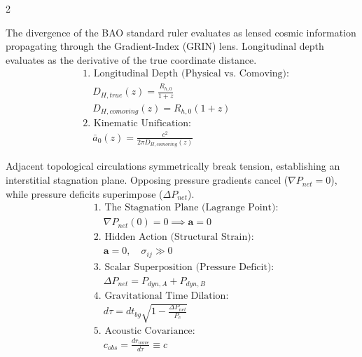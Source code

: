 \begin{multicols}{2}
\begin{tcolorbox}[cheatbox, title={\refstepcounter{cheatnum}\label{box:bao_lensing}\thecheatnum. BAO \& Kinematic Unification \hfill\scriptsize\hyperref[sec:deriv_bao_lensing]{[Proof $\downarrow$]}}]
The divergence of the BAO standard ruler evaluates as lensed cosmic information propagating through the Gradient-Index (GRIN) lens. Longitudinal depth evaluates as the derivative of the true coordinate distance. 
\begin{align}
    &\text{1. Longitudinal Depth (Physical vs. Comoving):} \nonumber \\
    &\quad   D_{H,true}(z) = \frac{R_{h,0}}{1+z} \label{eq:bao_longitudinal} \\
    &\quad   D_{H,comoving}(z) = R_{h,0}(1+z) \label{eq:bao_comoving} \\
    &\text{2. Kinematic Unification:} \nonumber \\
    &\quad \bar{a}_0(z) = \frac{c^2}{2\pi D_{H,comoving}(z)} \label{eq:bao_kinematic_unification_z}
\end{align}
\end{tcolorbox}

\begin{tcolorbox}[cheatbox, title={\refstepcounter{cheatnum}\label{box:auxetic_symmetry_covariance}\thecheatnum. Symmetry Breaking \& Covariance \hfill\makebox[0pt][r]{\scriptsize\hyperref[sec:deriv_auxetic_symmetry_covariance]{[Proof $\downarrow$]}}}]
Adjacent topological circulations symmetrically break tension, establishing an interstitial stagnation plane. Opposing pressure gradients cancel ($\nabla P_{net} = 0$), while pressure deficits superimpose ($\Delta P_{net}$). 
\begin{align}
    &\text{1. The Stagnation Plane (Lagrange Point):} \nonumber \\
    &\quad \nabla P_{net}(0) = 0 \implies \mathbf{a} = 0 \label{eq:gradient_cancellation} \\
    &\text{2. Hidden Action (Structural Strain):} \nonumber \\
    &\quad \mathbf{a} = 0, \quad \sigma_{ij} \gg 0 \label{eq:hidden_action_stress} \\
    &\text{3. Scalar Superposition (Pressure Deficit):} \nonumber \\
    &\quad \Delta P_{net} = P_{dyn,A} + P_{dyn,B} \label{eq:scalar_superposition} \\
    &\text{4. Gravitational Time Dilation:} \nonumber \\
    &\quad d\tau = dt_{bg} \sqrt{1 - \frac{\Delta P_{net}}{P_c}} \label{eq:scalar_time_dilation} \\
    &\text{5. Acoustic Covariance:} \nonumber \\
    &\quad c_{obs} = \frac{dr_{wave}}{d\tau} \equiv c \label{eq:acoustic_covariance}
\end{align}
\end{tcolorbox}


\end{multicols}
